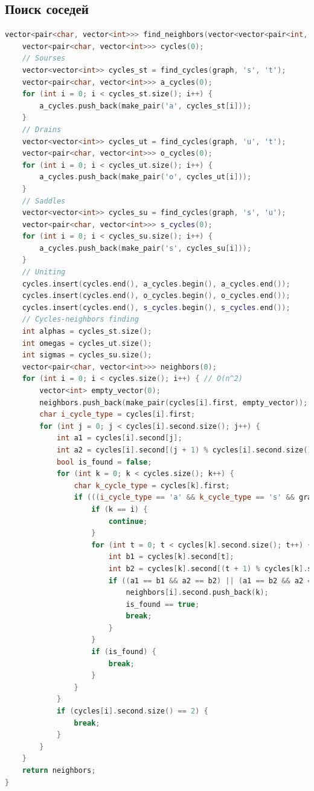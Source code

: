 \subsection{Поиск соседей}
\begin{lstlisting}[language=C++]
vector<pair<char, vector<int>>> find_neighbors(vector<vector<pair<int, char>>>& graph) {
	vector<pair<char, vector<int>>> cycles(0);
	// Sourses
	vector<vector<int>> cycles_st = find_cycles(graph, 's', 't');
	vector<pair<char, vector<int>>> a_cycles(0);
	for (int i = 0; i < cycles_st.size(); i++) {
		a_cycles.push_back(make_pair('a', cycles_st[i]));
	}
	// Drains
	vector<vector<int>> cycles_ut = find_cycles(graph, 'u', 't');
	vector<pair<char, vector<int>>> o_cycles(0);
	for (int i = 0; i < cycles_ut.size(); i++) {
		a_cycles.push_back(make_pair('o', cycles_ut[i]));
	}
	// Saddles
	vector<vector<int>> cycles_su = find_cycles(graph, 's', 'u');
	vector<pair<char, vector<int>>> s_cycles(0);
	for (int i = 0; i < cycles_su.size(); i++) {
		a_cycles.push_back(make_pair('s', cycles_su[i]));
	}
	// Uniting
	cycles.insert(cycles.end(), a_cycles.begin(), a_cycles.end());
	cycles.insert(cycles.end(), o_cycles.begin(), o_cycles.end());
	cycles.insert(cycles.end(), s_cycles.begin(), s_cycles.end());
	// Cycles-neighbors finding
	int alphas = cycles_st.size();
	int omegas = cycles_ut.size();
	int sigmas = cycles_su.size();
	vector<pair<char, vector<int>>> neighbors(0);
	for (int i = 0; i < cycles.size(); i++) { // O(n^2)
		vector<int> empty_vector(0);
		neighbors.push_back(make_pair(cycles[i].first, empty_vector));
		char i_cycle_type = cycles[i].first;
		for (int j = 0; j < cycles[i].second.size(); j++) {
			int a1 = cycles[i].second[j];
			int a2 = cycles[i].second[(j + 1) % cycles[i].second.size()];
			bool is_found = false;
			for (int k = 0; k < cycles.size(); k++) {
				char k_cycle_type = cycles[k].first;
				if (((i_cycle_type == 'a' && k_cycle_type == 's' && graph[a1][1].first == a2)) || (i_cycle_type == 'o' && k_cycle_type == 's' && graph[a1][2].first == a2) || (i_cycle_type == 's' && ((k_cycle_type == 'a' && graph[a1][1].first == a2) || (k_cycle_type == 'o' && graph[a1][2].first == a2)))) {
					if (k == i) {
						continue;
					}
					for (int t = 0; t < cycles[k].second.size(); t++) {
						int b1 = cycles[k].second[t];
						int b2 = cycles[k].second[(t + 1) % cycles[k].second.size()];
						if ((a1 == b1 && a2 == b2) || (a1 == b2 && a2 == b1)) {
							neighbors[i].second.push_back(k);
							is_found == true;
							break;
						}
					}
					if (is_found) {
						break;
					}
				}
			}
			if (cycles[i].second.size() == 2) {
				break;
			}
		}
	}
	return neighbors;
}
\end{lstlisting}
